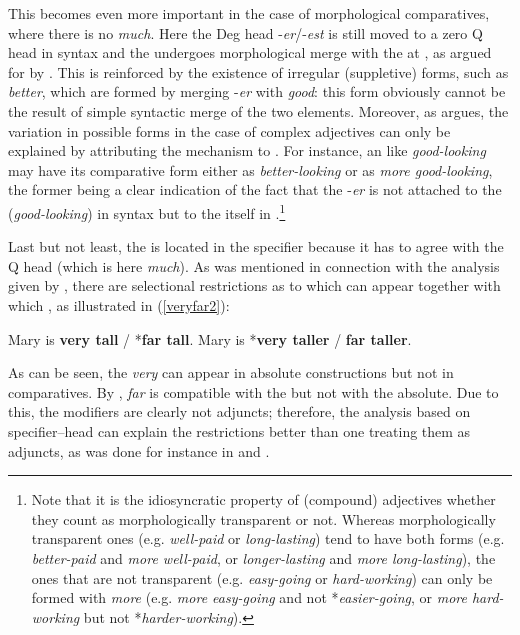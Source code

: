 \largerpage[1]
This becomes even more important in the case of morphological comparatives, where there is no \textit{much}. Here the Deg head -\textit{er}/-\textit{est} is still moved to a zero Q head in syntax and the  undergoes morphological merge with the  at , as argued for by \citet[45--51]{kantor2010diss}. This is reinforced by the existence of irregular (suppletive) forms, such as \textit{better}, which are formed by merging -\textit{er} with \textit{good}: this form obviously cannot be the result of simple syntactic merge of the two elements. Moreover, as \citet[49--51]{kantor2010diss} argues, the variation in possible forms in the case of complex adjectives can only be explained by attributing the mechanism to . For instance, an  like \textit{good-looking} may have its comparative form either as \textit{better-looking} or as \textit{more good-looking}, the former being a clear indication of the fact that the -\textit{er} is not attached to the  (\textit{good-looking}) in syntax but to the  itself in .\footnote{Note that it is the idiosyncratic property of (compound) adjectives whether they count as morphologically transparent or not. Whereas morphologically transparent ones (e.g. \textit{well-paid} or \textit{long-lasting}) tend to have both forms (e.g. \textit{better-paid} and \textit{more well-paid}, or \textit{longer-lasting} and \textit{more long-lasting}), the ones that are not transparent (e.g. \textit{easy-going} or \textit{hard-working}) can only be formed with \textit{more} (e.g. \textit{more easy-going} and not *\textit{easier-going}, or \textit{more hard-working} but not *\textit{harder-working}).}

Last but not least, the   is located in the specifier because it has to agree with the Q head (which is here \textit{much}). As was mentioned in connection with the analysis given by \citet{corver1997}, there are selectional restrictions as to which  can appear together with which , as illustrated in (\ref{veryfar2}):

\ea \label{veryfar2}
\ea	Mary is \textbf{very tall} / *\textbf{far tall}.
\ex	Mary is *\textbf{very taller} / \textbf{far taller}.
\z
\z

As can be seen, the  \textit{very} can appear in absolute constructions but not in comparatives. By , \textit{far} is compatible with the  but not with the absolute. Due to this, the  modifiers are clearly not adjuncts; therefore, the analysis based on specifier--head  can explain the restrictions better than one treating them as adjuncts, as was done for instance in \citet{bresnan1973} and \citet{corver1997}.

